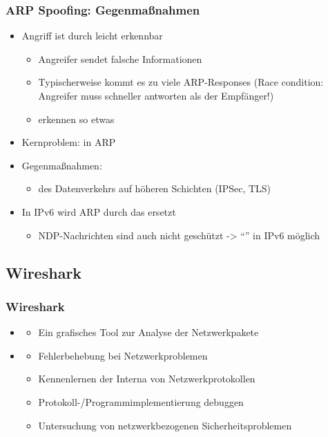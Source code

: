 \subsubsection*{ARP Spoofing: Gegenmaßnahmen}
\begin{itemize}
    \item Angriff ist durch  leicht erkennbar
    \begin{itemize}
        \item Angreifer sendet falsche Informationen
        \item Typischerweise kommt es zu viele ARP-Responses (Race condition: Angreifer muss schneller antworten als der Empfänger!)
        \item {} erkennen so etwas
    \end{itemize}
    \item Kernproblem:  in ARP
    \item Gegenmaßnahmen:
    \begin{itemize}
        \item {} des Datenverkehrs auf höheren Schichten (IPSec, TLS) 
    \end{itemize}
    \item In IPv6 wird ARP durch das  ersetzt
    \begin{itemize}
        \item NDP-Nachrichten sind auch nicht geschützt -> \enquote{} in IPv6 möglich
    \end{itemize}
\end{itemize}
\clearpage
\subsection{Wireshark}
\subsubsection*{Wireshark}
\begin{itemize}
    \item {}
    \begin{itemize}
        \item Ein grafisches Tool zur Analyse der Netzwerkpakete
    \end{itemize}
    \item {}
    \begin{itemize}
        \item Fehlerbehebung bei Netzwerkproblemen
        \item Kennenlernen der Interna von Netzwerkprotokollen
        \item Protokoll-/Programmimplementierung debuggen
        \item Untersuchung von netzwerkbezogenen Sicherheitsproblemen
    \end{itemize}
\end{itemize}
